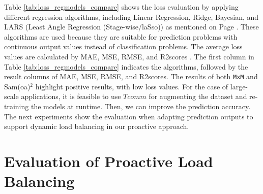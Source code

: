 Table \ref{tab:loss_regmodels_compare} shows the loss evaluation by applying different regression algorithms, including Linear Regression, Ridge, Bayesian, and LARS (Least Angle Regression (Stage-wise/laSso)) as mentioned on Page \pageref{enum:exp_vayring}. These algorithms are used because they are suitable for prediction problems with continuous output values instead of classification problems. The average loss values are calculated by MAE, MSE, RMSE, and R2scores \cite{naser2021errormetricsml}. The first column in Table \ref{tab:loss_regmodels_compare} indicates the algorithms, followed by the result columns of MAE, MSE, RMSE, and R2scores. The results of both \texttt{MxM} and Sam(oa)$^2$ highlight positive results, with low loss values. For the case of large-scale applications, it is feasible to use $Tcomm$ for augmenting the dataset and re-training the models at runtime. Then, we can improve the prediction accuracy. The next experiments show the evaluation when adapting prediction outputs to support dynamic load balancing in our proactive approach.

\section{Evaluation of Proactive Load Balancing} \label{sec:evaluate_proact_lb}

